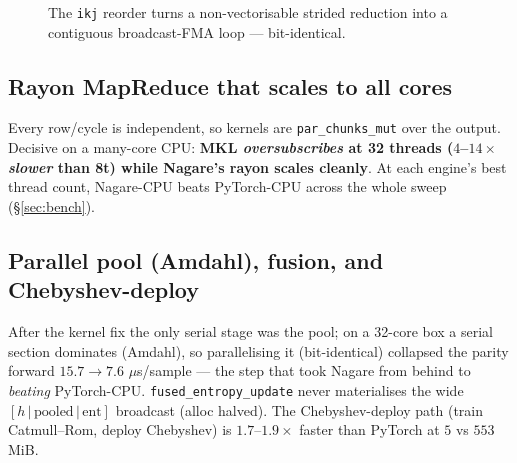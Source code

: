 \documentclass[11pt]{article}
\begin{document}
\begin{figure}[h]\centering
{}
\caption{\label{fig:ikj}The \texttt{ikj} reorder turns a non-vectorisable
strided reduction into a contiguous broadcast-FMA loop --- bit-identical.}
\end{figure}

\subsection{Rayon MapReduce that scales to all cores}
Every row/cycle is independent, so kernels are \texttt{par\_chunks\_mut} over the
output. Decisive on a many-core CPU: \textbf{MKL \emph{oversubscribes} at 32
threads ($4$--$14\times$ \emph{slower} than 8t) while Nagare's rayon scales
cleanly}. At each engine's best thread count, Nagare-CPU beats PyTorch-CPU across
the whole sweep (\S\ref{sec:bench}).

\subsection{Parallel pool (Amdahl), fusion, and Chebyshev-deploy}
After the kernel fix the only serial stage was the pool; on a 32-core box a
serial section dominates (Amdahl), so parallelising it (bit-identical) collapsed
the parity forward $15.7\to7.6$ $\mu$s/sample --- the step that took Nagare from
behind to \emph{beating} PyTorch-CPU. \texttt{fused\_entropy\_update} never
materialises the wide \([h\,|\,\text{pooled}\,|\,\text{ent}]\) broadcast (alloc
halved). The Chebyshev-deploy path (train Catmull--Rom, deploy Chebyshev) is
$1.7$--$1.9\times$ faster than PyTorch at $5$ vs $553$ MiB.
\end{document}
